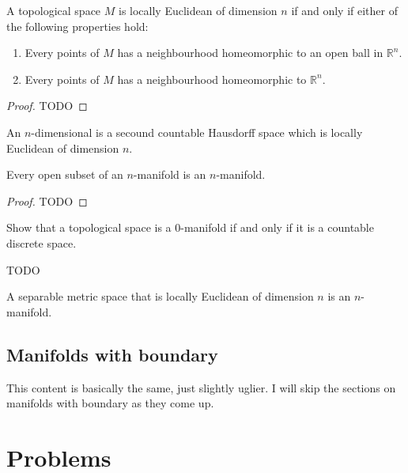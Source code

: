 \begin{lemma}
	A topological space $ M $ is locally Euclidean of dimension $ n $ if and only if either of the following properties hold:
	\begin{enumerate}
		\item Every points of $ M $ has a neighbourhood homeomorphic to an open ball in $ \mathbb{R}^{n} $.
		\item Every points of $ M $ has a neighbourhood homeomorphic to $ \mathbb{R}^{n} $.
	\end{enumerate}
	\begin{proof}
		TODO
	\end{proof}
\end{lemma}

\begin{definition}
	An $ n $-dimensional  is a secound countable Hausdorff space which is locally Euclidean of dimension $ n $.
\end{definition}

\begin{proposition}
	Every open subset of an $ n $-manifold is an $ n $-manifold.
	\begin{proof}
		TODO
	\end{proof}
\end{proposition}

\begin{exercise}
	\begin{problem}
	Show that a topological space is a $ 0 $-manifold if and only if it is a countable discrete space.
	\end{problem}
	\begin{solution}
		TODO
	\end{solution}
\end{exercise}

\begin{proposition}
	A separable metric space that is locally Euclidean of dimension $ n $ is an $ n $-manifold.
\end{proposition}

\subsection{Manifolds with boundary}
This content is basically the same, just slightly uglier. I will skip the sections on manifolds with boundary as they come up.

\section{Problems}


